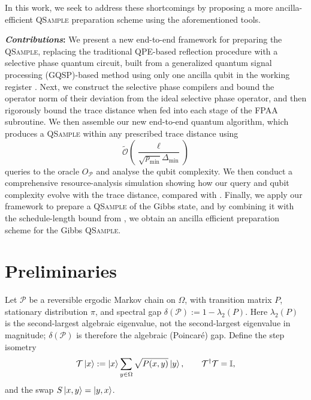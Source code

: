 \documentclass[10pt,conference]{IEEEtran}
\theoremstyle{plain}
\theoremstyle{remark}
\begin{document}
In this work, we seek to address these shortcomings by proposing a more ancilla-efficient \textsc{QSample} preparation scheme using the aforementioned tools.


\textbf{\textit{Contributions}:} We present a new end-to-end framework for preparing the \textsc{QSample}, replacing the traditional QPE-based reflection procedure with a selective phase quantum circuit, built from a generalized quantum signal processing (GQSP)-based method using only one ancilla qubit in the working register \cite{MotlaghWiebe2024GQSP, claudon2025simplealgorithmreflecteigenspaces}. Next, we construct the selective phase compilers and bound the operator norm of their deviation from the ideal selective phase operator, and then rigorously bound the trace distance when fed into each stage of the FPAA subroutine. We then assemble our new end-to-end quantum algorithm, which produces a \textsc{QSample} within any prescribed trace distance using
\begin{equation}
\widetilde{\mathcal{O}}\left(
\frac{\ell}{\sqrt{p_{\min}}\Delta_{\min}}
\right)
\end{equation}
queries to the oracle $O_{\mathcal{P}}$ and analyse the qubit complexity. We then conduct a comprehensive resource-analysis simulation showing how our query and qubit complexity evolve with the trace distance, compared with \cite{wocjan_speed-up_2008}. Finally, we apply our framework to prepare a \textsc{QSample} of the Gibbs state, and by combining it with the schedule-length bound from \cite{Arunachalam_2022}, we obtain an ancilla efficient preparation scheme for the Gibbs \textsc{QSample}.


\section{Preliminaries}
\label{sec:preliminaries}
Let \(\mathcal P\) be a reversible ergodic Markov chain on
\(\Omega\), with transition matrix \(P\), stationary distribution
\(\pi\), and spectral gap
\(\delta(\mathcal P):=1-\lambda_2(P)\).  Here \(\lambda_2(P)\) is the
second-largest algebraic eigenvalue, not the second-largest eigenvalue
in magnitude; \(\delta(\mathcal P)\) is therefore the algebraic
(Poincar\'e) gap.  Define the step isometry
\begin{equation}
\mathcal T\ket{x}
:=
\ket{x}\sum_{y\in\Omega}\sqrt{P(x,y)}\ket{y},
\qquad
\mathcal T^\dagger\mathcal T=\mathbb I ,
\end{equation}
and the swap \(S\ket{x,y}=\ket{y,x}\).
\end{document}
